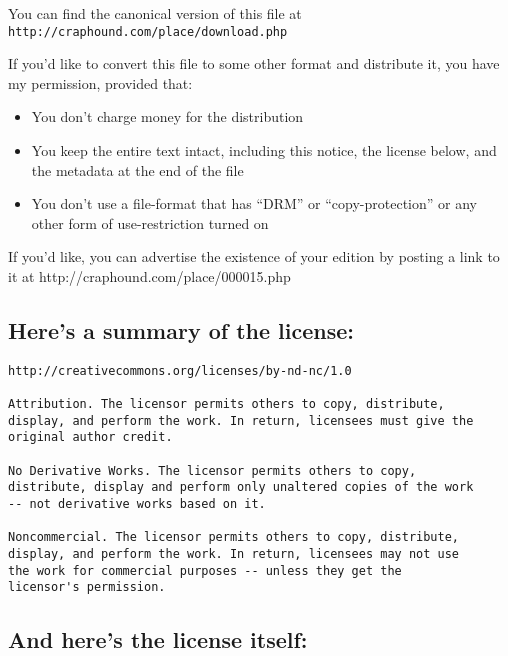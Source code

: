 You can find the canonical version of this file at\\
\texttt{http://craphound.com/place/download.php}

If you'd like to convert this file to some other format and
distribute it, you have my permission, provided that:

\begin{itemize}
\item
  You don't charge money for the distribution

\item
  You keep the entire text intact, including this notice, the license
  below, and the metadata at the end of the file

\item
  You don't use a file-format that has ``DRM'' or ``copy-protection''
  or any other form of use-restriction turned on

\end{itemize}
If you'd like, you can advertise the existence of your edition by
posting a link to it at http://craphound.com/place/000015.php


\subsection{Here's a summary of the license:}

\begin{verbatim}
http://creativecommons.org/licenses/by-nd-nc/1.0

Attribution. The licensor permits others to copy, distribute,
display, and perform the work. In return, licensees must give the
original author credit.

No Derivative Works. The licensor permits others to copy,
distribute, display and perform only unaltered copies of the work
-- not derivative works based on it.

Noncommercial. The licensor permits others to copy, distribute,
display, and perform the work. In return, licensees may not use
the work for commercial purposes -- unless they get the
licensor's permission.
\end{verbatim}

\subsection{And here's the license itself:}

